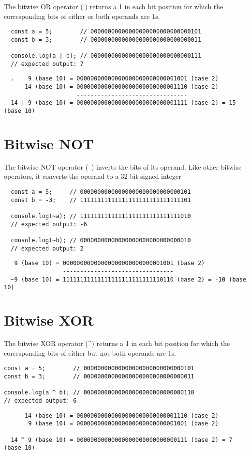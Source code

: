 \documentclass{article}
\begin{document}
The bitwise OR operator (|) returns a 1 in each bit position for which the corresponding bits of either or both operands are 1s.

\begin{verbatim}
  const a = 5;        // 00000000000000000000000000000101
  const b = 3;        // 00000000000000000000000000000011

  console.log(a | b); // 00000000000000000000000000000111
  // expected output: 7
\end{verbatim}

\begin{verbatim}
  .    9 (base 10) = 00000000000000000000000000001001 (base 2)
      14 (base 10) = 00000000000000000000000000001110 (base 2)
                     --------------------------------
  14 | 9 (base 10) = 00000000000000000000000000001111 (base 2) = 15 (base 10)
\end{verbatim}

\section{Bitwise NOT}

The bitwise NOT operator (~) inverts the bits of its operand. Like other bitwise operators, it converts the operand to a 32-bit signed integer

\begin{verbatim}
  const a = 5;     // 00000000000000000000000000000101
  const b = -3;    // 11111111111111111111111111111101

  console.log(~a); // 11111111111111111111111111111010
  // expected output: -6

  console.log(~b); // 00000000000000000000000000000010
  // expected output: 2
\end{verbatim}

\begin{verbatim}
   9 (base 10) = 00000000000000000000000000001001 (base 2)
                 --------------------------------
  ~9 (base 10) = 11111111111111111111111111110110 (base 2) = -10 (base 10)
\end{verbatim}

\section{Bitwise XOR}

The bitwise XOR operator (^) returns a 1 in each bit position for which the corresponding bits of either but not both operands are 1s.

\begin{verbatim}
const a = 5;        // 00000000000000000000000000000101
const b = 3;        // 00000000000000000000000000000011

console.log(a ^ b); // 00000000000000000000000000000110
// expected output: 6
\end{verbatim}

\begin{verbatim}
      14 (base 10) = 00000000000000000000000000001110 (base 2)
       9 (base 10) = 00000000000000000000000000001001 (base 2)
                     --------------------------------
  14 ^ 9 (base 10) = 00000000000000000000000000000111 (base 2) = 7 (base 10)
\end{verbatim}
\end{document}

